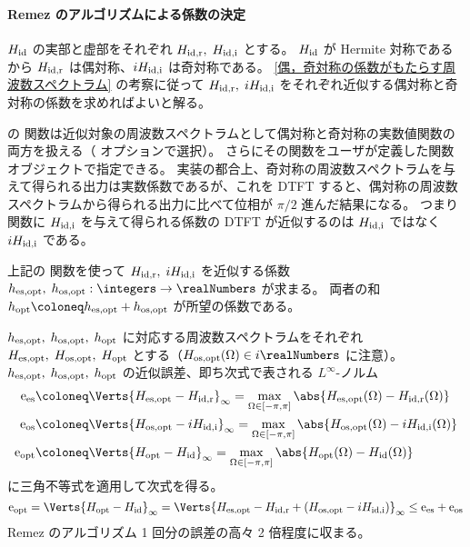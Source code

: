             \paragraph{Remez のアルゴリズムによる係数の決定}
                \label{Remez のアルゴリズムによる係数の決定}
                $H_{\text{id}}$ の実部と虚部をそれぞれ $H_{\text{id,r}},\;H_{\text{id,i}}$ とする。
                $H_{\text{id}}$ が Hermite 対称であるから $H_{\text{id,r}}$ は偶対称、$iH_{\text{id,i}}$ は奇対称である。
                \ref{偶，奇対称の係数がもたらす周波数スペクトラム} の考察に従って $H_{\text{id,r}},\;iH_{\text{id,i}}$ をそれぞれ近似する偶対称と奇対称の係数を求めればよいと解る。
                \par
                \cite{DSP_JL} の  関数は近似対象の周波数スペクトラムとして偶対称と奇対称の実数値関数の両方を扱える（ オプションで選択）。
                さらにその関数をユーザが定義した関数オブジェクトで指定できる。
                実装の都合上、奇対称の周波数スペクトラムを与えて得られる出力は実数係数であるが、これを DTFT すると、偶対称の周波数スペクトラムから得られる出力に比べて位相が $\pi/2$ 進んだ結果になる。
                つまり  関数に $H_{\text{id,i}}$ を与えて得られる係数の DTFT が近似するのは $H_{\text{id,i}}$ ではなく $iH_{\text{id,i}}$ である。
                \par
                上記の  関数を使って $H_{\text{id,r}},\;iH_{\text{id,i}}$ を近似する係数 $\hesOpt,\;\hosOpt:\integers\to\realNumbers$ が求まる。
                両者の和 $\hopt \coloneq \hesOpt + \hosOpt$ が所望の係数である。
                \par
                $h_{\text{es,opt}},\;h_{\text{os,opt}},\;h_{\text{opt}}$ に対応する周波数スペクトラムをそれぞれ $H_{\text{es,opt}},\;H_{\text{os,opt}},\;H_{\text{opt}}$ とする（$\HosOpt(\Omega)\in i\realNumbers$ に注意）。
                $h_{\text{es,opt}},\;h_{\text{os,opt}},\;h_{\text{opt}}$ の近似誤差、即ち次式で表される $L^\infty$-ノルム
                \begin{align*}
                    \eEs &\coloneq \Verts{\HesOpt - \HidR}_\infty = \max_{\Omega\in[-\pi,\pi]}\abs{\HesOpt(\Omega) - \HidR(\Omega)} \\
                    \eOs &\coloneq \Verts{\HosOpt - i\HidI}_\infty = \max_{\Omega\in[-\pi,\pi]}\abs{\HosOpt(\Omega) - i\HidI(\Omega)} \\
                    \eOpt &\coloneq \Verts{\Hopt - \Hid}_\infty = \max_{\Omega\in[-\pi,\pi]}\abs{\Hopt(\Omega ) -\Hid(\Omega)}
                \end{align*}
                に三角不等式を適用して次式を得る。
                \[ \eOpt = \Verts{\Hopt - \Hid}_\infty = \Verts{\HesOpt - \HidR + (\HosOpt - i\HidI)}_\infty \leq \eEs + \eOs \]
                Remez のアルゴリズム 1 回分の誤差の高々 2 倍程度に収まる。
